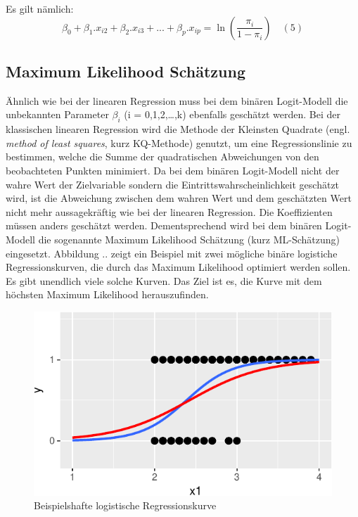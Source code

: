 \documentclass[12pt,]{article}
\begin{document}
Es gilt nämlich: \[
\beta_0 + \beta_1.x_{i2} + \beta_2.x_{i3} + ... + \beta_p.x_{ip} = \ln(\frac{\pi_i}{1-\pi_i}) \quad (5)
\]

\subsection{Maximum Likelihood
Schätzung}\label{maximum-likelihood-schatzung}

Ähnlich wie bei der linearen Regression muss bei dem binären
Logit-Modell die unbekannten Parameter \(\beta_i\) (i =
0,1,2,\ldots{},k) ebenfalls geschätzt werden. Bei der klassischen
linearen Regression wird die Methode der Kleinsten Quadrate (engl.
\emph{method of least squares}, kurz KQ-Methode) genutzt, um eine
Regressionslinie zu bestimmen, welche die Summe der quadratischen
Abweichungen von den beobachteten Punkten minimiert. Da bei dem binären
Logit-Modell nicht der wahre Wert der Zielvariable sondern die
Eintrittswahrscheinlichkeit geschätzt wird, ist die Abweichung zwischen
dem wahren Wert und dem geschätzten Wert nicht mehr aussagekräftig wie
bei der linearen Regression. Die Koeffizienten müssen anders geschätzt
werden. Dementsprechend wird bei dem binären Logit-Modell die sogenannte
Maximum Likelihood Schätzung (kurz ML-Schätzung) eingesetzt. Abbildung
.. zeigt ein Beispiel mit zwei mögliche binäre logistiche
Regressionskurven, die durch das Maximum Likelihood optimiert werden
sollen. Es gibt unendlich viele solche Kurven. Das Ziel ist es, die
Kurve mit dem höchsten Maximum Likelihood herauszufinden.

\begin{figure}[h]

{\centering \includegraphics{logisticRegression_files/figure-latex/unnamed-chunk-2-1} 

}

\caption{Beispielshafte logistische Regressionskurve}\label{fig:unnamed-chunk-2}
\end{figure}
\end{document}
